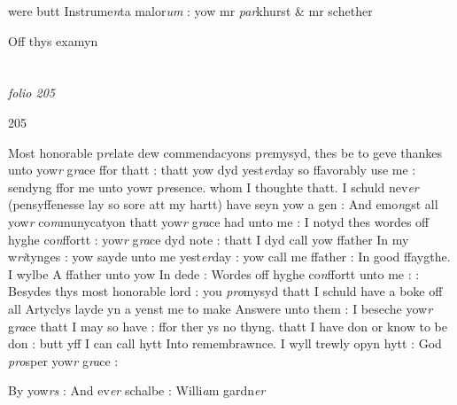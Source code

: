 \documentclass[12pt, a4paper]{book}
\begin{document}
		
		\ifthenelse{\isodd{\thepage}}
		{\reversemarginpar}
		{\normalmarginpar}
		were butt Instrume\textit{n}ta malor\textit{um }:
			yow mr \textit{par}khurst \& mr schether
 	
		\ifthenelse{\isodd{\thepage}}
		{\reversemarginpar}
		{\normalmarginpar}
		Off thys examyn
	

\dotfill
						\newpage {} \section*{}

\textit{folio 205}



\begin{flushright}{\color{Mahogany}205}\end{flushright}

	
		\ifthenelse{\isodd{\thepage}}
		{\reversemarginpar}
		{\normalmarginpar}
		Most honorable p\textit{re}late dew commendacyons p\textit{re}mysyd, thes
		be to geve thankes unto yow\textit{r} g\textit{ra}ce ffor thatt : thatt
yow dyd yest\textit{er}day so ffavorably use me : sendyng
ffor me unto yowr p\textit{re}sence. whom I thoughte thatt. I
schuld nev\textit{er} (pensyffenesse lay so sore att my hartt)
have seyn yow a gen : And emo\textit{n}gst all yow\textit{r} co\textit{m}munycatyon
thatt yow\textit{r} g\textit{ra}ce had unto me : I notyd thes wordes off
		hyghe co\textit{n}ffortt : yow\textit{r} g\textit{ra}ce dyd note : thatt I dyd call yow 
ffather In my w\textit{ri}tynges : yow sayde unto me yest\textit{er}day :
yow call me ffather : In good ffaygthe. I wylbe
A ffather unto yow
			 In dede : Wordes off hyghe
co\textit{n}ffortt unto me : : Besydes thys most honorable 
lord : you \textit{pro}mysyd thatt I schuld have a boke off 
all Artyclys layde yn a yenst me to make 
Answere unto them : I beseche yow\textit{r} g\textit{ra}ce thatt I may
so have : ffor ther ys no thyng. thatt I have don
or know to be don : butt yff I can call hytt Into
remembrawnce. I wyll trewly opyn hytt : God
		\textit{pro}sper yow\textit{r} g\textit{ra}ce :


	
		\ifthenelse{\isodd{\thepage}}
		{\reversemarginpar}
		{\normalmarginpar}
		By yow\textit{rs} : And ev\textit{er} 
schalbe : Willi\textit{a}m gardn\textit{er}


               
\dotfill
						\newpage
{}
\end{document}
